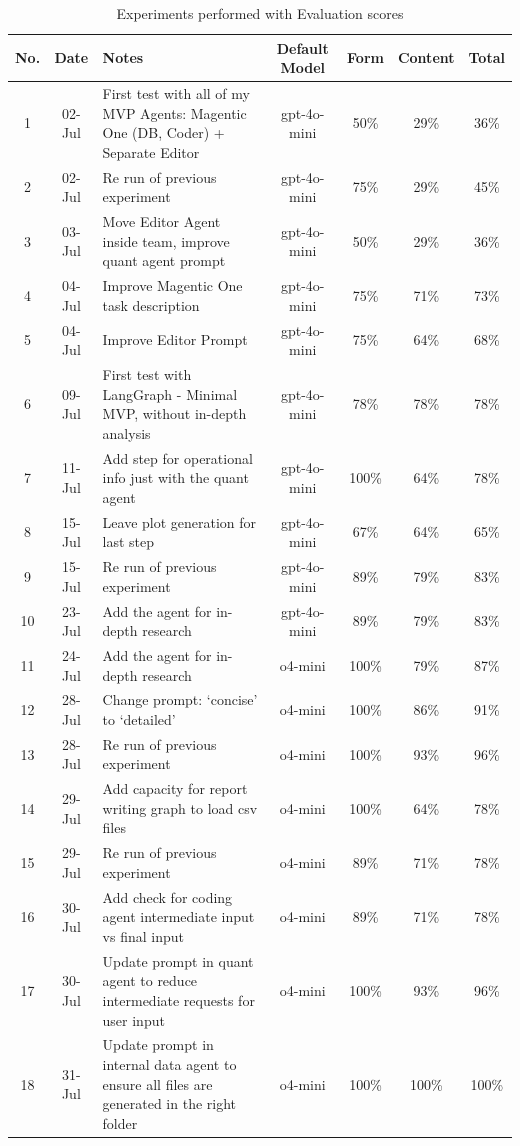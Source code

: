 \documentclass[a4paper]{report}
\begin{document}
\begin{table}[H]
\centering
\begin{tabular}{|c|c|p{7cm}|c|c|c|c|}
    \hline
    No. & Date & Notes & Default Model & Form & Content & Total \\ \hline
    1 & 02-Jul & First test with all of my MVP Agents: Magentic One (DB, Coder) + Separate Editor & gpt-4o-mini & 50\% & 29\% & 36\% \\ \hline
    2 & 02-Jul & Re run of previous experiment & gpt-4o-mini & 75\% & 29\% & 45\% \\ \hline
    3 & 03-Jul & Move Editor Agent inside team, improve quant agent prompt & gpt-4o-mini & 50\% & 29\% & 36\% \\ \hline
    4 & 04-Jul & Improve Magentic One task description & gpt-4o-mini & 75\% & 71\% & 73\% \\ \hline
    5 & 04-Jul & Improve Editor Prompt & gpt-4o-mini & 75\% & 64\% & 68\% \\ \hline
    6 & 09-Jul & First test with LangGraph - Minimal MVP, without in-depth analysis & gpt-4o-mini & 78\% & 78\% & 78\% \\ \hline
    7 & 11-Jul & Add step for operational info just with the quant agent & gpt-4o-mini & 100\% & 64\% & 78\% \\ \hline
    8 & 15-Jul & Leave plot generation for last step & gpt-4o-mini & 67\% & 64\% & 65\% \\ \hline
    9 & 15-Jul & Re run of previous experiment  & gpt-4o-mini & 89\% & 79\% & 83\% \\ \hline
    10 & 23-Jul & Add the agent for in-depth research & gpt-4o-mini & 89\% & 79\% & 83\% \\ \hline
    11 & 24-Jul & Add the agent for in-depth research & o4-mini & 100\% & 79\% & 87\% \\ \hline
    12 & 28-Jul & Change prompt: `concise' to `detailed' & o4-mini & 100\% & 86\% & 91\% \\ \hline
    13 & 28-Jul & Re run of previous experiment & o4-mini & 100\% & 93\% & 96\% \\ \hline
    14 & 29-Jul & Add capacity for report writing graph to load csv files & o4-mini & 100\% & 64\% & 78\% \\ \hline
    15 & 29-Jul & Re run of previous experiment & o4-mini & 89\% & 71\% & 78\% \\ \hline
    16 & 30-Jul & Add check for coding agent intermediate input vs final input & o4-mini & 89\% & 71\% & 78\% \\ \hline
    17 & 30-Jul & Update prompt in quant agent to reduce intermediate requests for user input & o4-mini & 100\% & 93\% & 96\% \\ \hline
    18 & 31-Jul & Update prompt in internal data agent to ensure all files are generated in the right folder & o4-mini & 100\% & 100\% & 100\% \\ \hline
    \end{tabular}
\caption{Experiments performed with Evaluation scores}
\end{table}
\end{document}

